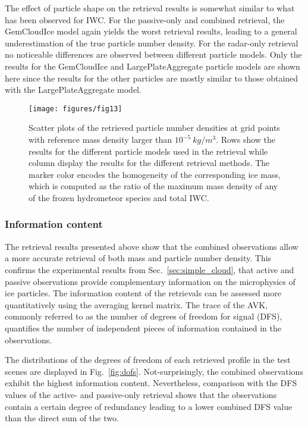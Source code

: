 \documentclass[journal abbreviation, manuscript]{copernicus}
\begin{document}
The effect of particle shape on the retrieval results is somewhat similar to
what has been observed for IWC. For the passive-only and combined retrieval, the
GemCloudIce model again yields the worst retrieval results, leading to a general
underestimation of the true particle number density. For the radar-only
retrieval no noticeable differences are observed between different particle
models. Only the results for the GemCloudIce and LargePlateAggregate particle
models are shown here since the results for the other particles are mostly similar
to those obtained with the LargePlateAggregate model.

\begin{figure}
\centering
\texttt{[image: figures/fig13]}
\caption{Scatter plots of the retrieved particle number densities at grid points
  with reference mass density larger than $10^{-5}\ \unit{kg/m^3}$. Rows show
  the results for the different particle models used in the retrieval while
  column display the results for the different retrieval methods. The marker
  color encodes the homogeneity of the corresponding ice mass, which is computed
  as the ratio of the maximum mass density of any of the frozen hydrometeor
  species and total IWC.}
\label{fig:results_nd_scatter_a}
\end{figure}

\subsubsection{Information content}

The retrieval results presented above show that the combined observations allow
a more accurate retrieval of both mass and particle number density. This
confirms the experimental results from Sec.~\ref{sec:simple_cloud}, that active
and passive observations provide complementary information on the microphysics
of ice particles. The information content of the retrievals can be assessed more
quantitatively using the averaging kernel matrix. The trace of the AVK, commonly
referred to as the number of degrees of freedom for signal (DFS), quantifies the
number of independent pieces of information contained in the observations.

The distributions of the degrees of freedom of each retrieved profile in the
test scenes are displayed in Fig.~\ref{fig:dofs}. Not-surprisingly, the combined
observations exhibit the highest information content. Nevertheless, comparison
with the DFS values of the active- and passive-only retrieval shows that the
observations contain a certain degree of redundancy leading to a lower combined
DFS value than the direct sum of the two.
\end{document}

